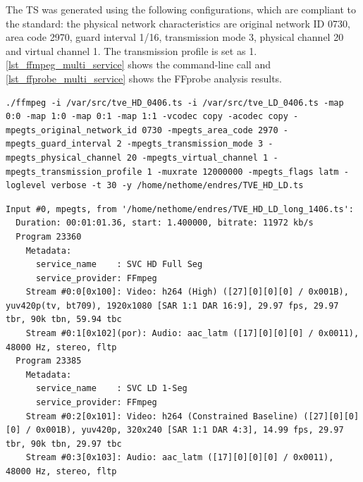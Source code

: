 \documentclass[
	12pt,				%
	openright,			%
	twoside,			%
	a4paper,			%
	brazil,
	french,				%
	english
	]{abntex2}
\begin{document}
The TS was generated using the following configurations, which are compliant to the standard: the physical network characteristics are original network ID 0730, area code 2970, guard interval 1/16, transmission mode 3, physical channel 20 and virtual channel 1. The transmission profile is set as 1. \autoref{lst_ffmpeg_multi_service} shows the command-line call and \autoref{lst_ffprobe_multi_service} shows the FFprobe analysis results.

\begin{minipage}{\linewidth}
\begin{lstlisting}[caption={FFmpeg command-line call to generate a multi-service TS}, label={lst_ffmpeg_multi_service}]
./ffmpeg -i /var/src/tve_HD_0406.ts -i /var/src/tve_LD_0406.ts -map 0:0 -map 1:0 -map 0:1 -map 1:1 -vcodec copy -acodec copy -mpegts_original_network_id 0730 -mpegts_area_code 2970 -mpegts_guard_interval 2 -mpegts_transmission_mode 3 -mpegts_physical_channel 20 -mpegts_virtual_channel 1 -mpegts_transmission_profile 1 -muxrate 12000000 -mpegts_flags latm -loglevel verbose -t 30 -y /home/nethome/endres/TVE_HD_LD.ts
\end{lstlisting}
\end{minipage}

\begin{minipage}{\linewidth}
\begin{lstlisting}[caption={FFprobe analysing the multi-service TS.}, label={lst_ffprobe_multi_service}]
Input #0, mpegts, from '/home/nethome/endres/TVE_HD_LD_long_1406.ts':
  Duration: 00:01:01.36, start: 1.400000, bitrate: 11972 kb/s
  Program 23360 
    Metadata:
      service_name    : SVC HD Full Seg
      service_provider: FFmpeg
    Stream #0:0[0x100]: Video: h264 (High) ([27][0][0][0] / 0x001B), yuv420p(tv, bt709), 1920x1080 [SAR 1:1 DAR 16:9], 29.97 fps, 29.97 tbr, 90k tbn, 59.94 tbc
    Stream #0:1[0x102](por): Audio: aac_latm ([17][0][0][0] / 0x0011), 48000 Hz, stereo, fltp
  Program 23385 
    Metadata:
      service_name    : SVC LD 1-Seg
      service_provider: FFmpeg
    Stream #0:2[0x101]: Video: h264 (Constrained Baseline) ([27][0][0][0] / 0x001B), yuv420p, 320x240 [SAR 1:1 DAR 4:3], 14.99 fps, 29.97 tbr, 90k tbn, 29.97 tbc
    Stream #0:3[0x103]: Audio: aac_latm ([17][0][0][0] / 0x0011), 48000 Hz, stereo, fltp
\end{lstlisting}
\end{minipage}
\end{document}
